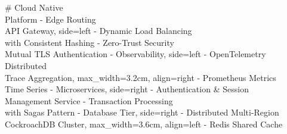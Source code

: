 \documentclass{article}
\begin{document}
\begin{mindchart}[layout=balanced, theme=ocean, style=underline, line=curve, scale=0.78]
# Cloud Native\\Platform
  - Edge Routing\\API Gateway, side=left
    - Dynamic Load Balancing\\with Consistent Hashing
    - Zero-Trust Security\\Mutual TLS Authentication
  - Observability, side=left
    - OpenTelemetry Distributed\\Trace Aggregation, max_width=3.2cm, align=right
    - Prometheus Metrics\\Time Series
  - Microservices, side=right
    - Authentication \& Session\\Management Service
    - Transaction Processing\\with Sagas Pattern
  - Database Tier, side=right
    - Distributed Multi-Region\\CockroachDB Cluster, max_width=3.6cm, align=left
    - Redis Shared Cache
\end{mindchart}
\end{document}

